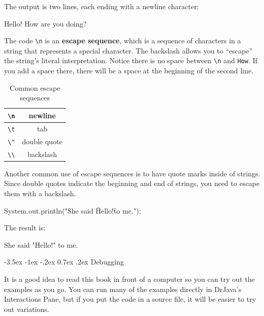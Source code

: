 \documentclass[12pt]{book}
\makeatletter
\theoremstyle{exercise}
\renewcommand{\section}{\@startsection {section}{1}{\z@}%
    {-3.5ex \@plus -1ex \@minus -.2ex}%
    {0.7ex \@plus.2ex}%
    {\normalfont\Large\bfseries}}
\makeatother
\begin{document}
The output is two lines, each ending with a newline character:

\begin{stdout}
Hello!
How are you doing?
\end{stdout}


The code \verb"\n" is an {\bf escape sequence}, which is a sequence of characters in a string that represents a special character.
The backslash allows you to ``escape'' the string's literal interpretation.
Notice there is no space between \verb"\n" and \verb"How".
If you add a space there, there will be a space at the beginning of the second line.

\begin{table}[!h]
\begin{center}
\begin{tabular}{|c|c|}
\hline
\verb"\n" & newline \\
\hline
\verb"\t" & tab \\
\hline
\verb'\"' & double quote \\
\hline
\verb"\\" & backslash \\
\hline
\end{tabular}
\caption{Common escape sequences}
\end{center}
\end{table}

Another common use of escape sequences is to have quote marks inside of strings.
Since double quotes indicate the beginning and end of strings, you need to escape them with a backslash.

\begin{code}
    System.out.println("She said \"Hello!\" to me.");
\end{code}

The result is:

\begin{stdout}
She said "Hello!" to me.
\end{stdout}


\section{Debugging}
\label{sec:examples}

It is a good idea to read this book in front of a computer so you can try out the examples as you go.
You can run many of the examples directly in DrJava's Interactions Pane, but if you put the code in a source file, it will be easier to try out variations.
\end{document}

